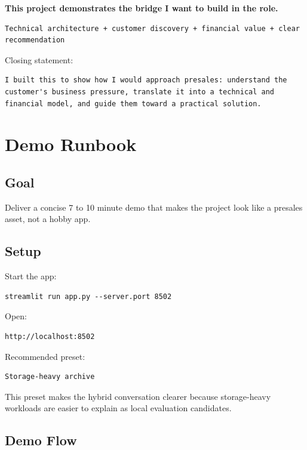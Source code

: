 \documentclass[11pt,a4paper]{article}
\begin{document}
\textbf{This project demonstrates the bridge I want to build in the role.}

\begin{lstlisting}
Technical architecture + customer discovery + financial value + clear recommendation
\end{lstlisting}

Closing statement:

\begin{lstlisting}
I built this to show how I would approach presales: understand the customer's business pressure, translate it into a technical and financial model, and guide them toward a practical solution.
\end{lstlisting}

\section{Demo Runbook}

\subsection{Goal}

Deliver a concise 7 to 10 minute demo that makes the project look like a presales asset, not a hobby app.

\subsection{Setup}

Start the app:

\begin{lstlisting}
streamlit run app.py --server.port 8502
\end{lstlisting}

Open:

\begin{lstlisting}
http://localhost:8502
\end{lstlisting}

Recommended preset:

\begin{lstlisting}
Storage-heavy archive
\end{lstlisting}

This preset makes the hybrid conversation clearer because storage-heavy workloads are easier to explain as local evaluation candidates.

\subsection{Demo Flow}
\end{document}
